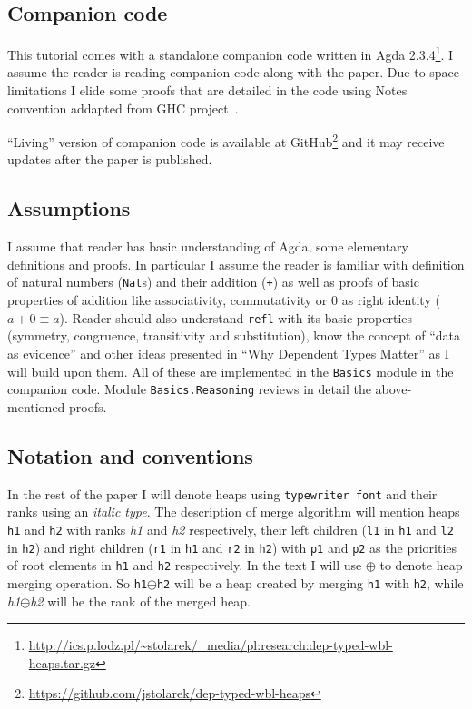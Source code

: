 \subsection{Companion code}

This tutorial comes with a standalone companion code written in Agda 2.3.4\footnote{\url{http://ics.p.lodz.pl/~stolarek/_media/pl:research:dep-typed-wbl-heaps.tar.gz}}. I assume the reader is reading companion code along with the paper. Due to space limitations I elide some proofs that are detailed in the code using Notes convention addapted from GHC project~\cite{MarPey12}.

``Living'' version of companion code is available at GitHub\footnote{\url{https://github.com/jstolarek/dep-typed-wbl-heaps}} and it may receive updates after the paper is published.

\subsection{Assumptions}

I assume that reader has basic understanding of Agda, some elementary definitions and proofs. In particular I assume the reader is familiar with definition of natural numbers (\texttt{Nat}s) and their addition (\texttt{+}) as well as proofs of basic properties of addition like associativity, commutativity or 0 as right identity ($a + 0 ≡ a$). Reader should also understand \texttt{refl} with its basic properties (symmetry, congruence, transitivity and substitution), know the concept of ``data as evidence'' and other ideas presented in ``Why Dependent Types Matter'' \cite{AltMcBMcK05} as I will build upon them. All of these are implemented in the \texttt{Basics} module in the companion code. Module \texttt{Basics.Reasoning} reviews in detail the above-mentioned proofs.

\subsection{Notation and conventions}

In the rest of the paper I will denote heaps using \texttt{typewriter font} and their ranks using an \textit{italic type}. The description of merge algorithm will mention heaps \texttt{h1} and \texttt{h2} with ranks \textit{h1} and \textit{h2} respectively, their left children (\texttt{l1} in \texttt{h1} and \texttt{l2} in \texttt{h2}) and right children (\texttt{r1} in \texttt{h1} and \texttt{r2} in \texttt{h2}) with \texttt{p1} and \texttt{p2} as the priorities of root elements in \texttt{h1} and \texttt{h2} respectively. In the text I will use $\oplus$ to denote heap merging operation. So \texttt{h1}$\oplus$\texttt{h2} will be a heap created by merging \texttt{h1} with \texttt{h2}, while \textit{h1}$\oplus$\textit{h2} will be the rank of the merged heap.

